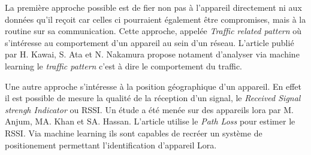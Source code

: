La première approche possible est de fier non pas à l'appareil directement ni aux données qu'il reçoit car celles ci pourraient également être compromises, mais à la routine sur sa communication. Cette approche, appelée \textit{Traffic related pattern} où s'intéresse au comportement d'un appareil au sein d'un réseau. L'article publié par H. Kawai, S. Ata et N. Nakamura \cite{pattern} propose notament d'analyser via machine learning le \textit{traffic pattern} c'est à dire le comportement du traffic.

Une autre approche s'intéresse à la position géographique d'un appareil. En effet il est possible de mesure la qualité de la réception d'un signal, le \textit{Received Signal strengh Indicator} ou RSSI. Un étude a été menée sur des appareils lora par M. Anjum, MA. Khan et SA. Hassan\cite{rssi}. L'article utilise le \textit{Path Loss} pour estimer le RSSI. Via machine learning ils sont capables de recréer un système de positionement permettant l'identification d'appareil Lora.
